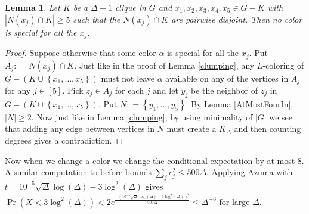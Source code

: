 \documentclass[12pt]{amsart}
\theoremstyle{plain}
\newtheorem{lem}[thm]{Lemma}
\theoremstyle{definition}
\theoremstyle{remark}
\newcommand{\set}[1]{\left\{ #1 \right\}}
\newcommand{\card}[1]{\left|#1\right|}
\newcommand{\irange}[1]{\left[#1\right]}
\newcommand{\DefinedAs}{\mathrel{\mathop:}=}
\begin{document}
\begin{lem}\label{LastStructure}
Let $K$ be a $\Delta-1$ clique in $G$ and $x_1, x_2, x_3, x_4, x_5 \in G - K$
with $\card{N(x_j) \cap K} \geq 5$ such that the $N(x_j) \cap K$ are pairwise
disjoint. Then no color is special for all the $x_j$.
\end{lem}
\begin{proof}
Suppose otherwise that some color $\alpha$ is special for all the $x_j$. Put
$A_j \DefinedAs N(x_j) \cap K$. Just like in the proof of Lemma \ref{clumping},
any $L$-coloring of $G - (K \cup \set{x_1, \ldots, x_5})$ must not leave
$\alpha$ available on any of the vertices in $A_j$ for any $j \in \irange{5}$.
Pick $z_j \in A_j$ for each $j$ and let $y_j$ be the neighbor of $z_j$ in $G -
(K \cup \set{x_1, \ldots, x_5})$. Put $N \DefinedAs \set{y_1, \ldots, y_5}$. By
Lemma \ref{AtMostFourIn}, $\card{N} \geq 2$.  Now just like in Lemma
\ref{clumping}, by using minimality of $\card{G}$ we see that adding any edge
between vertices in $N$ must create a $K_\Delta$ and then counting degrees gives
a contradiction.
\end{proof}

Now when we change a color we change the conditional expectation by at most $8$.
A similar computation to before bounds $\sum_j c_j^2 \leq 500\Delta$.  Applying
Azuma with $t = 10^{-5}\sqrt{\Delta}\log(\Delta) - 3\log^2(\Delta)$ gives $\Pr(X
< 3\log^2(\Delta)) < 2e^{\frac{-(10^{-5}\sqrt{\Delta}\log(\Delta) -
3\log^2(\Delta))^2}{500\Delta}} \leq \Delta^{-6}$ for large $\Delta$.




\end{document}

